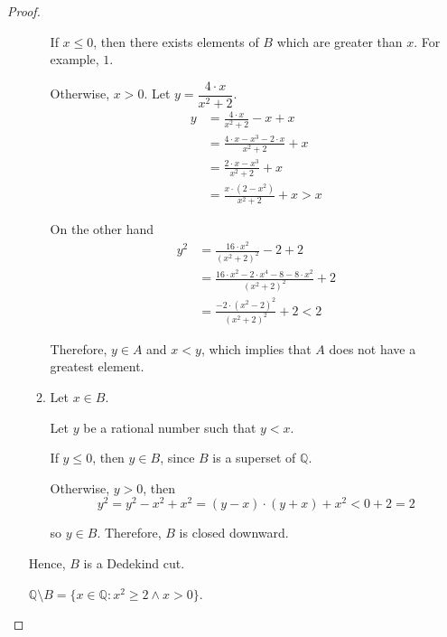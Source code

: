 \begin{proof}
\begin{itemize}[topsep=0pt]
\begin{enumerate}[label={(\roman*)},topsep=0pt]
                        If $x\le 0$, then there exists elements of $B$ which are greater than $x$. For example, $1$.

                        Otherwise, $x > 0$. Let $y = \dfrac{4\cdot x}{{x}^{2} + 2}$.
                        \begin{align*}
                            y & = \frac{4\cdot x}{{x}^{2} + 2} - x + x                  \\
                              & = \frac{4\cdot x - {x}^{3} - 2\cdot x}{{x}^{2} + 2} + x \\
                              & = \frac{2\cdot x - {x}^{3}}{{x}^{2} + 2} + x            \\
                              & = \frac{x\cdot (2 - {x}^{2})}{{x}^{2} + 2} + x > x
                        \end{align*}

                        On the other hand
                        \begin{align*}
                            {y}^{2} & = \frac{16\cdot {x}^{2}}{{({x}^{2} + 2)}^{2}} - 2 + 2                                  \\
                                    & = \frac{16\cdot {x}^{2} - 2\cdot{x}^{4} - 8 - 8\cdot {x}^{2}}{{({x}^{2} + 2)}^{2}} + 2 \\
                                    & = \frac{-2\cdot {({x}^{2} - 2)}^{2}}{{({x}^{2} + 2)}^{2}} + 2 < 2
                        \end{align*}

                        Therefore, $y\in A$ and $x < y$, which implies that $A$ does not have a greatest element.
                  \item Let $x\in B$.

                        Let $y$ be a rational number such that $y < x$.

                        If $y\le 0$, then $y\in B$, since $B$ is a superset of $\mathbb{Q}$.

                        Otherwise, $y > 0$, then
                        \[
                            {y}^{2} = {y}^{2} - {x}^{2} + {x}^{2} = (y - x)\cdot(y + x) + {x}^{2} < 0 + 2 = 2
                        \]

                        so $y\in B$. Therefore, $B$ is closed downward.
              \end{enumerate}

              Hence, $B$ is a Dedekind cut.

              $\mathbb{Q}\setminus B = \{ x\in\mathbb{Q}: {x}^{2}\ge 2 \wedge x > 0 \}$.


\end{itemize}
\end{proof}

